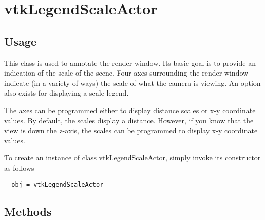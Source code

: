 \section{vtkLegendScaleActor}

\subsection{Usage}

 This class is used to annotate the render window. Its basic goal is to
 provide an indication of the scale of the scene. Four axes surrounding the
 render window indicate (in a variety of ways) the scale of what the camera
 is viewing. An option also exists for displaying a scale legend.

 The axes can be programmed either to display distance scales or x-y
 coordinate values. By default, the scales display a distance. However,
 if you know that the view is down the z-axis, the scales can be programmed
 to display x-y coordinate values.


To create an instance of class vtkLegendScaleActor, simply
invoke its constructor as follows
\begin{verbatim}
  obj = vtkLegendScaleActor
\end{verbatim}
\subsection{Methods}

